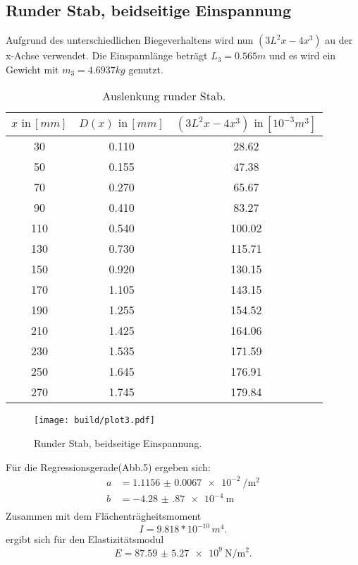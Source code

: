 \subsection{Runder Stab, beidseitige Einspannung}
Aufgrund des unterschiedlichen Biegeverhaltens wird nun $(3L^2x-4x^3)$
au der x-Achse verwendet. Die Einspannlänge beträgt $L_3 = 0.565m$
und es wird ein Gewicht mit $m_3 = 4.6937 kg$ genutzt.

\begin{table}[h]
  \centering
  \label{tab:lit3}
  \begin{tabular}{ c c c }
    \toprule
    $x \,\, \text{in} \, [mm]$
   &{$D(x) \,\, \text{in} \, [mm]$}
   &{$(3L^2x-4x^3)\,\, \text{in} \, [10^{-3}m^3]$} \\

    \midrule
    30  & 0.110 & 28.62\\
    50  & 0.155 & 47.38\\
    70  & 0.270 & 65.67\\
    90  & 0.410 & 83.27\\
    110 & 0.540 & 100.02\\
    130 & 0.730 & 115.71\\
    150 & 0.920 & 130.15\\
    170 & 1.105 & 143.15\\
    190 & 1.255 & 154.52\\
    210 & 1.425 & 164.06\\
    230 & 1.535 & 171.59\\
    250 & 1.645 & 176.91\\
    270 & 1.745 & 179.84\\

    \bottomrule
  \end{tabular}
  \caption{Auslenkung runder Stab.}
\end{table}

\begin{figure}
  \centering
  \texttt{[image: build/plot3.pdf]}
  \caption{Runder Stab, beidseitige Einspannung.}
  \label{fig:plot3}
\end{figure}
Für die Regressionsgerade(Abb.5) ergeben sich:
\begin{align*}
  a &= \SI{1.1156(67)e-2}{\per\square\meter} \\
  b &= \SI{-4.28(87)e-4}{\meter} \\
\end{align*}
Zusammen mit dem Flächenträgheitsmoment
\begin{equation*}
  I = 9.818*10^{-10}\, m^4.
\end{equation*}
ergibt sich für den Elastizitätsmodul
\begin{equation*}
  E = \SI{87.59(527)e9}{\newton\per\square\meter} .
\end{equation*}
\newpage

